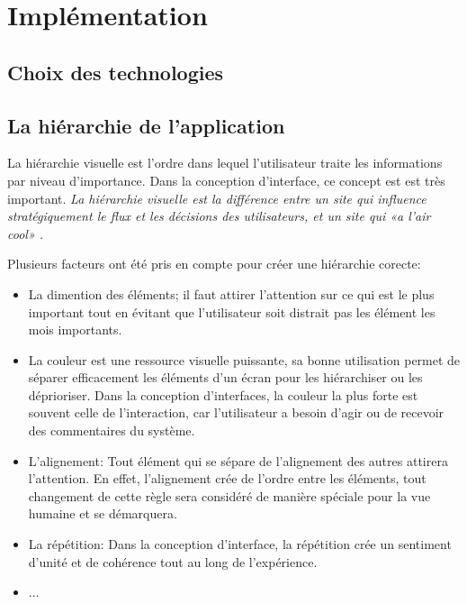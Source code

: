 \chapter{Implémentation}
        \section{Choix des technologies}
                
                \newpage
        \section{La hiérarchie de l'application}
                
        La hiérarchie visuelle est l'ordre dans lequel l'utilisateur traite les informations par niveau d'importance.
        Dans la conception d'interface, ce concept est est très important.
        \textit{La hiérarchie visuelle est la différence entre un site qui influence stratégiquement le flux et les 
        décisions des utilisateurs, et un site qui «a l'air cool» \cite{cao20155}.}
        \par 
        Plusieurs facteurs ont été pris en compte pour créer une hiérarchie corecte:
        \begin{itemize}
                \item La dimention des éléments; il faut attirer l'attention sur ce qui est le plus important
                tout en évitant que l'utilisateur soit distrait pas les élément les mois importants.
                \item La couleur est une ressource visuelle puissante, sa bonne utilisation permet de séparer 
                efficacement les éléments d'un écran pour les hiérarchiser ou les déprioriser. Dans la 
                conception d’interfaces, la couleur la plus forte est souvent celle de l’interaction, 
                car l’utilisateur a besoin d’agir ou de recevoir des commentaires du système.
                \item L'alignement: Tout élément qui se sépare de l'alignement des autres attirera l'attention. 
                En effet, l'alignement crée de l'ordre entre les éléments, tout changement de cette règle sera 
                considéré de manière spéciale pour la vue humaine et se démarquera.
                \item La répétition: Dans la conception d'interface, la répétition crée un sentiment 
                d'unité et de cohérence tout au long de l'expérience.
                \item ...\cite{design}

        \end{itemize}
